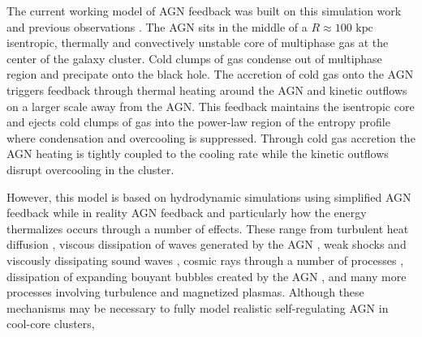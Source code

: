 \documentclass[iop,apjl, twocolappendix]{emulateapj}   %
\begin{document}
The current working model of AGN feedback was built on this simulation work and
previous observations
\cite{voit_global_2017,gaspari_raining_2017,gaspari_unifying_2017}. The AGN
sits in the middle of a $R \approx 100 \text{ kpc}$ isentropic, thermally and
convectively unstable core of multiphase gas at the center of the galaxy
cluster. Cold clumps of gas condense out of multiphase region and precipate
onto the black hole. The accretion of cold gas onto the AGN triggers feedback
through thermal heating around the AGN and kinetic outflows on a larger scale
away from the AGN. This feedback maintains the isentropic core and ejects cold
clumps of gas into the power-law region of the entropy profile where
condensation and overcooling is suppressed. Through cold gas accretion the AGN
heating is tightly coupled to the cooling rate while the kinetic outflows
disrupt overcooling in the cluster.

However, this model is based on hydrodynamic simulations using simplified AGN
feedback while in reality AGN feedback and particularly how the energy
thermalizes occurs through a number of effects.
These range from 
turbulent heat diffusion \cite{ruszkowski_galaxy_2011},
viscous dissipation of waves generated by the AGN \cite{ruszkowski_cluster_2004},
weak shocks and viscously dissipating sound waves \cite{fabian_deep_2003,fabian_viscosity_2005},
cosmic rays through a number of processes \cite{guo_feedback_2008,ruszkowski_global_2017},
dissipation of expanding bouyant bubbles created by the AGN \cite{churazov_evolution_2001-2},
and many more  processes involving turbulence and magnetized plasmas. Although
these mechanisms may be necessary to fully model realistic self-regulating AGN
in cool-core clusters,

\end{document}

